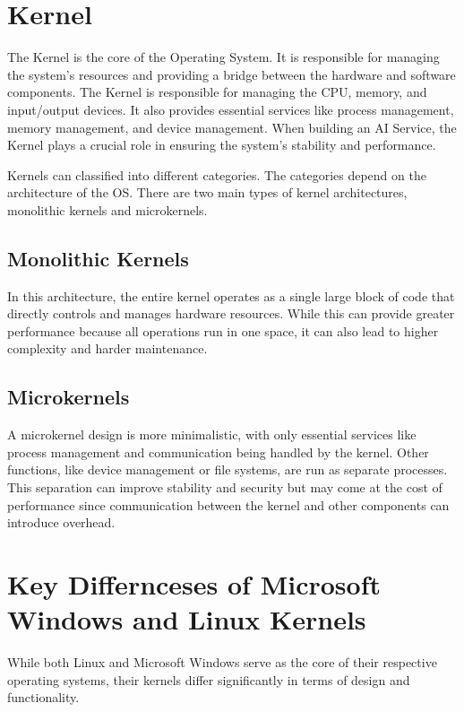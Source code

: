 \cite{TypesOfOs}

\section {Kernel}

The Kernel is the core of the Operating System. It is responsible for managing the system's resources and providing a bridge between the hardware and software components. The Kernel is responsible for managing the CPU, memory, and input/output devices. It also provides essential services like process management, memory management, and device management.
When building an AI Service, the Kernel plays a crucial role in ensuring the system's stability and performance.

Kernels can classified into different categories. The categories depend on the architecture of the OS. There are two main types of kernel architectures, monolithic kernels and microkernels.

\subsection{Monolithic Kernels}
In this architecture, the entire kernel operates as a single large block of code that directly controls and manages hardware resources. While this can provide greater performance because all operations run in one space, it can also lead to higher complexity and harder maintenance.

\subsection{Microkernels}
A microkernel design is more minimalistic, with only essential services like process management and communication being handled by the kernel. Other functions, like device management or file systems, are run as separate processes. This separation can improve stability and security but may come at the cost of performance since communication between the kernel and other components can introduce overhead.

\section{Key Differnceses of Microsoft Windows and Linux Kernels}
While both Linux and Microsoft Windows serve as the core of their respective operating systems, their kernels differ significantly in terms of design and functionality.

